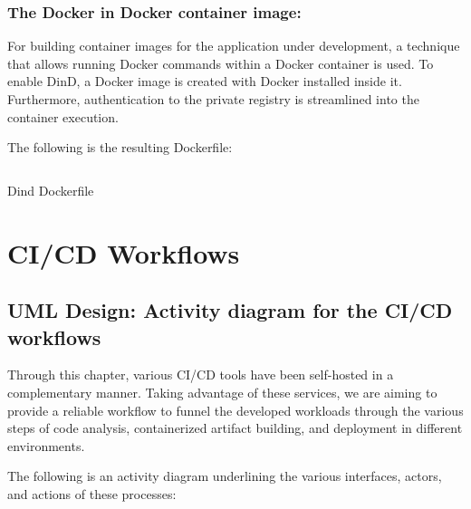\subsubsection{The Docker in Docker container image: }

For building container images for the application under development, a technique that allows running Docker commands within a Docker container is used. To enable DinD, a Docker image is created with Docker installed inside it. Furthermore, authentication to the private registry is streamlined into the container execution.

The following is the resulting Dockerfile:

\begin{listing}[H]
    \inputminted{Dockerfile}{codeListing/dind-Dockerfile}
    \caption{Dind Dockerfile}
    \label{lst:Dind Dockerfile}
\end{listing}


\newpage

\section{CI/CD Workflows}

\subsection{UML Design: Activity diagram for the CI/CD workflows } 

Through this chapter, various CI/CD tools have been self-hosted in a complementary manner. Taking advantage of these services, we are aiming to provide a reliable workflow to funnel the developed workloads through the various steps of code analysis, containerized artifact building, and deployment in different environments.

The following is an activity diagram underlining the various interfaces, actors, and actions of these processes: 


